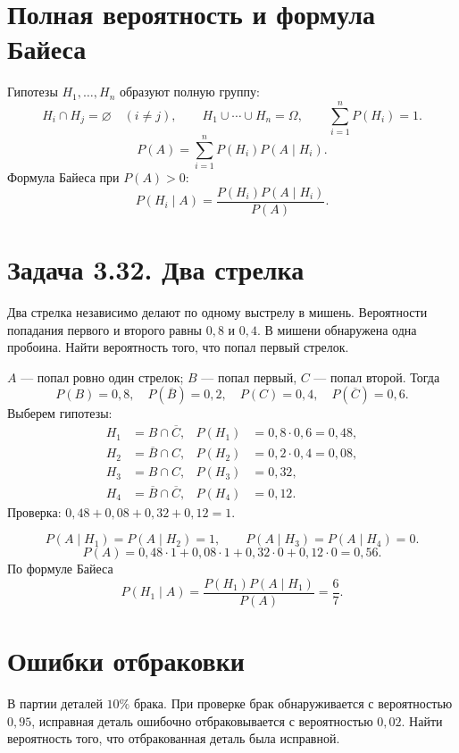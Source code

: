


\section*{Полная вероятность и формула Байеса}
Гипотезы $H_1,\ldots,H_n$ образуют полную группу:
\[
 H_i\cap H_j=\varnothing\quad(i\ne j),\qquad
 H_1\cup\cdots\cup H_n=\Omega,\qquad \sum_{i=1}^nP(H_i)=1.
\]
\[
 P(A)=\sum_{i=1}^nP(H_i)P(A\mid H_i).
\]
Формула Байеса при $P(A)>0$:
\[
 \boxed{P(H_i\mid A)=\frac{P(H_i)P(A\mid H_i)}{P(A)}.}
\]

\section*{Задача 3.32. Два стрелка}
Два стрелка независимо делают по одному выстрелу в мишень.
Вероятности попадания первого и второго равны $0{,}8$ и $0{,}4$.
В мишени обнаружена одна пробоина. Найти вероятность того,
что попал первый стрелок.

$A$ --- попал ровно один стрелок; $B$ --- попал первый,
$C$ --- попал второй. Тогда
\[
 P(B)=0{,}8,\quad P(\overline B)=0{,}2,\quad
 P(C)=0{,}4,\quad P(\overline C)=0{,}6.
\]
Выберем гипотезы:
\begin{align*}
 H_1&=B\cap\overline C,& P(H_1)&=0{,}8\cdot0{,}6=0{,}48,\\
 H_2&=\overline B\cap C,&P(H_2)&=0{,}2\cdot0{,}4=0{,}08,\\
 H_3&=B\cap C,&P(H_3)&=0{,}32,\\
 H_4&=\overline B\cap\overline C,&P(H_4)&=0{,}12.
\end{align*}
Проверка: $0{,}48+0{,}08+0{,}32+0{,}12=1$.

\[
 P(A\mid H_1)=P(A\mid H_2)=1,\qquad
 P(A\mid H_3)=P(A\mid H_4)=0.
\]
\[
 P(A)=0{,}48\cdot1+0{,}08\cdot1+0{,}32\cdot0+0{,}12\cdot0=0{,}56.
\]
По формуле Байеса
\[
 P(H_1\mid A)=\frac{P(H_1)P(A\mid H_1)}{P(A)}=\frac67.
\]

\section*{Ошибки отбраковки}
В партии деталей $10\%$ брака. При проверке брак обнаруживается с вероятностью
$0{,}95$, исправная деталь ошибочно отбраковывается с вероятностью $0{,}02$.
Найти вероятность того, что отбракованная деталь была исправной.

